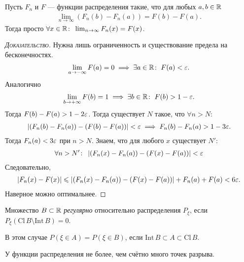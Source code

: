 \documentclass[../main.tex]{subfiles}
\begin{document}
\begin{remrk}
 Пусть $ F_n $ и $ F $ --- функции распределения такие, что для любых $ a, b \in \mathbb{R} $
 \begin{align*}
  \lim_{n \to \infty} (F_n(b) - F_n(a)) = F(b)  - F(a).
 \end{align*} Тогда просто $ \forall x \in \mathbb{R} \colon\; \lim_{n \to \infty}  F_n(x) = F(x)$.
\end{remrk}
\begin{proof}[\normalfont\textsc{Доказательство}]
 Нужна лишь ограниченность и существование предела на бесконечностях.
 \begin{align*}
  \lim_{a \to -\infty}  F(a) = 0 \implies \exists a \in \mathbb{R} \colon\;  F(a) < \varepsilon.
 \end{align*} Аналогично
 \begin{align*}
  \lim_{b \to +\infty} F(b) = 1 \implies \exists b \in \mathbb{R} \colon\; F(b) > 1 - \varepsilon. 
 \end{align*} Тогда $ F(b) - F(a) > 1 -2\varepsilon $. Тогда существует $ N $ такое, что $ \forall n > N \colon\;  $
 \begin{align*}
  \left|(F_n(b) - F_n(a)) - (F(b)-F(a)) \right| < \varepsilon \implies F_n(b) - F_n(a) > 1 - 3\varepsilon. 
 \end{align*} Тогда $ F_n(a) < 3\varepsilon $ при $ n > N $. Знаем, что для любого $ x $ существует $ N' $:
 \begin{align*}
  \forall n > N' \colon\; \left|(F_n(x) - F_n(a)) - (F(x)-F(a)) \right| < \varepsilon
 \end{align*} Следовательно,
 \begin{align*}
  \left|F_n(x) - F(x) \right| \leqslant \left| (F_n(x) - F_n(a)) - (F(x) - F(a)) \right| + F_n(a) + F(a) < 6\varepsilon.
 \end{align*} Наверное можно оптимальнее.
\end{proof}

\begin{df}
 Множество $ B \subset \mathbb{R} $ \textit{регулярно} относительно распределения $ P_\xi $, если $ P_\xi(\mathrm{Cl}\,B \setminus \mathrm{Int}\,B) = 0 $.
\end{df}

В этом случае $ P(\xi \in A) = P(\xi \in B) $, если $ \mathrm{Int}\,B \subset A \subset \mathrm{Cl}\,B $.

\begin{prop*}
 У функции распределения не более, чем счётно много точек разрыва.
\end{prop*}
\end{document}
